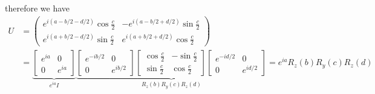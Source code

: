 \documentclass{article}
\begin{document}
therefore we have
\begin{align*}   
U &= 
\begin{pmatrix}
   \displaystyle e^{i(a - b/2 - d/2)} \cos \frac{c}{2} & \displaystyle -e^{i(a - b/2 + d/2)} \sin \frac{c}{2} \\[1em]
   \displaystyle e^{i(a + b/2 - d/2)} \sin \frac{c}{2} & \displaystyle e^{i(a + b/2 + d/2)} \cos \frac{c}{2}
\end{pmatrix} \\[0.6em]&= 
\underbrace{
\begin{bmatrix}
e^{ia} & 0 \\[0.8em]
0 & e^{ia}
\end{bmatrix}
}_{e^{ia}I}
\underbrace{
\begin{bmatrix}
e^{-ib/2} & 0 \\[0.8em]
0 & e^{ib/2}
\end{bmatrix}
\begin{bmatrix}
\displaystyle \cos \frac{c}{2} & \displaystyle -\sin \frac{c}{2} \\[0.8em]
\displaystyle \sin \frac{c}{2} & \displaystyle \cos \frac{c}{2}
\end{bmatrix}
\begin{bmatrix}
e^{-id/2} & 0 \\[0.8em]
0 & e^{id/2}
\end{bmatrix}
}_{R_z(b)R_y(c)R_z(d)} = 
e^{ia}R_z(b)R_y(c)R_z(d)
\end{align*}
\end{document}
